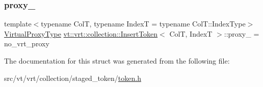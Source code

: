 \mbox{\label{structvt_1_1vrt_1_1collection_1_1_insert_token_ac809490fd2affc800cbf1eb31fced9a1}} 
\subsubsection{\texorpdfstring{proxy\+\_\+}{proxy\_}}
{\footnotesize\ttfamily template$<$typename ColT, typename IndexT = typename Col\+T\+::\+Index\+Type$>$ \\
\hyperlink{namespacevt_a1b417dd5d684f045bb58a0ede70045ac}{Virtual\+Proxy\+Type} \hyperlink{structvt_1_1vrt_1_1collection_1_1_insert_token}{vt\+::vrt\+::collection\+::\+Insert\+Token}$<$ ColT, IndexT $>$\+::proxy\+\_\+ = no\+\_\+vrt\+\_\+proxy\hspace{0.3cm}{\ttfamily [private]}}



The documentation for this struct was generated from the following file\+:\begin{DoxyCompactItemize}
\item 
src/vt/vrt/collection/staged\+\_\+token/\hyperlink{token_8h}{token.\+h}\end{DoxyCompactItemize}
